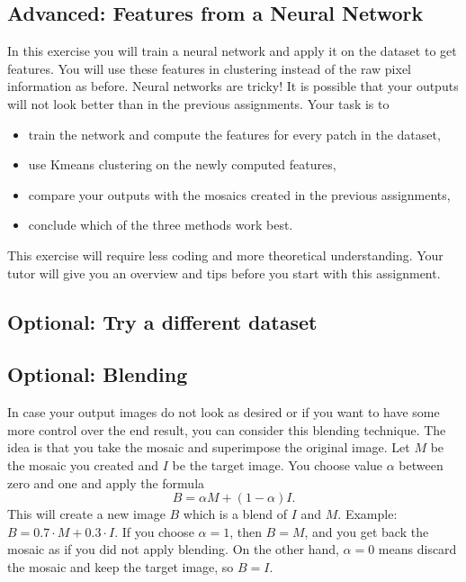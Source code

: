 \documentclass[a4paper]{article}
\begin{document}
	\subsection{Advanced: Features from a Neural Network}
		In this exercise you will train a neural network and apply it on the dataset to get features. 
		You will use these features in clustering instead of the raw pixel information as before.
		Neural networks are tricky! It is possible that your outputs will not look better than in the previous assignments.
		Your task is to
		\begin{itemize}
			\item train the network and compute the features for every patch in the dataset,
			\item use Kmeans clustering on the newly computed features,
			\item compare your outputs with the mosaics created in the previous assignments,
			\item conclude which of the three methods work best.
		\end{itemize}
		This exercise will require less coding and more theoretical understanding.
		Your tutor will give you an overview and tips before you start with this assignment.
	
	\subsection{Optional: Try a different dataset}
		
		
	
	\subsection{Optional: Blending}
		In case your output images do not look as desired or if you want to have some more control over the end result, you can consider this blending technique.
		The idea is that you take the mosaic and superimpose the original image.
		Let $M$ be the mosaic you created and $I$ be the target image.
		You choose value $\alpha$ between zero and one and apply the formula
		\begin{equation}
			B = \alpha M + (1 - \alpha) I.
		\end{equation}
		This will create a new image $B$ which is a blend of $I$ and $M$.
		Example: $B = 0.7 \cdot M + 0.3 \cdot I$.
		If you choose $\alpha = 1$, then $B = M$, and you get back the mosaic as if you did not apply blending.
		On the other hand, $\alpha = 0$ means discard the mosaic and keep the target image, so $B = I$.
\end{document}
